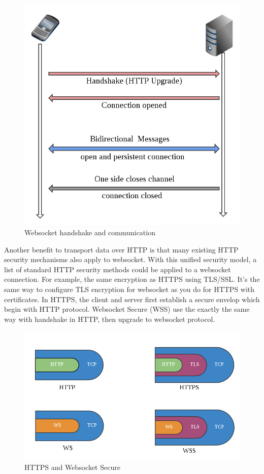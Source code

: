 \documentclass[numbers,numberedpars]{sigplanconf}
\begin{document}
\begin{figure}[tbph]
  \centering
  \label{fig:websocket_connection}
  \includegraphics[scale=0.3]{websocket.png}
  \caption{Websocket handshake and communication}
\end{figure}

Another benefit to transport data over HTTP is that many existing HTTP security mechanisms also apply to websocket.
With this unified security model, a list of standard HTTP security methods could be applied to a websocket connection.
For example, the same encryption as HTTPS using TLS/SSL. It's the same way to configure TLS encryption for websocket as you do for HTTPS with
certificates. In HTTPS, the client and server first establish a secure envelop which begin with HTTP protocol. Websocket Secure (WSS) use
the exactly the same way with handshake in HTTP, then upgrade to websocket protocol. 

\begin{figure}[tbph]
  \centering
  \label{fig:wss}
  \includegraphics[scale=0.3]{wss.png}
  \caption{HTTPS and Websocket Secure}
\end{figure}
\end{document}
